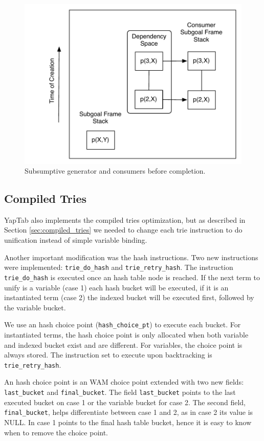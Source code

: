 \begin{figure}[ht]
  \centering
    \includegraphics[scale=0.5]{completion_space.pdf}
  \caption{Subsumptive generator and consumers before completion.}
  \label{fig:completion_space}
\end{figure}

\subsection{Compiled Tries}

YapTab also implements the compiled tries optimization, but as described in Section \ref{sec:compiled_tries}
we needed to change each trie instruction to do unification instead of simple variable binding.

Another important modification was the hash instructions. Two new instructions were
implemented: \texttt{trie\_do\_hash} and \texttt{trie\_retry\_hash}.
The instruction \texttt{trie\_do\_hash} is executed once an hash table node is reached.
If the next term to unify is a variable (case 1) each hash bucket will be executed, if it is an instantiated term (case 2)
the indexed bucket will be executed first, followed by the variable bucket.

We use an hash choice point (\texttt{hash\_choice\_pt}) to execute each bucket.
For instantiated terms, the hash choice point is only allocated when both variable and indexed bucket
exist and are different. For variables, the choice point is always stored. The instruction
set to execute upon backtracking is \texttt{trie\_retry\_hash}.

An hash choice point is an WAM choice point extended with two new fields:
\texttt{last\_bucket} and \texttt{final\_bucket}.
The field \texttt{last\_bucket} points to the last executed bucket on case 1 or the
variable bucket for case 2.
The second field, \texttt{final\_bucket}, helps differentiate between
case 1 and 2, as in case 2 its value is NULL. In case 1 points to the final hash table bucket,
hence it is easy to know when to remove the choice point.

